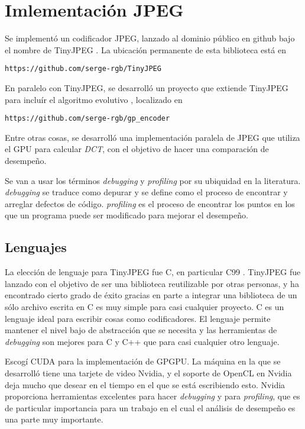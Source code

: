 \chapter{Imlementación JPEG}\label{ch:implementacion}

Se implementó un codificador JPEG, lanzado al dominio público en github bajo el
nombre de TinyJPEG \cite{tiny_jpeg}. La ubicación permanente de esta biblioteca
está en \begin{alltt}https://github.com/serge-rgb/TinyJPEG \end{alltt}

En paralelo con TinyJPEG, se desarrolló un proyecto que extiende TinyJPEG para
incluír el algoritmo evolutivo \cite{gp_encoder}, localizado en
\begin{alltt}https://github.com/serge-rgb/gp_encoder\end{alltt} Entre otras
cosas, se desarrolló una implementación paralela de JPEG que utiliza el GPU
para calcular \emph{DCT}, con el objetivo de hacer una comparación de
desempeño.

Se van a usar los términos \emph{debugging} y \emph{profiling} por su ubiquidad
en la literatura. \emph{debugging} se traduce como depurar y se define como el
proceso de encontrar y arreglar defectos de código. \emph{profiling} es el
proceso de encontrar los puntos en los que un programa puede ser modificado
para mejorar el desempeño.

\section{Lenguajes}

La elección de lenguaje para TinyJPEG fue C, en particular C99 \cite{c99}.
TinyJPEG fue lanzado con el objetivo de ser una biblioteca reutilizable por
otras personas, y ha encontrado cierto grado de éxito gracias en parte a
integrar una biblioteca de un sólo archivo escrita en C es muy simple para casi
cualquier proyecto. C es un lenguaje ideal para escribir cosas como
codificadores. El lenguaje permite mantener el nivel bajo de abstracción que se
necesita y las herramientas de \emph{debugging} son mejores para C y C++ que
para casi cualquier otro lenguaje.

Escogí CUDA para la implementación de GPGPU. La máquina en la que se desarrolló
tiene una tarjete de video Nvidia, y el soporte de OpenCL en Nvidia deja mucho
que desear en el tiempo en el que se está escribiendo esto. Nvidia proporciona
herramientas excelentes para hacer \emph{debugging} y para \emph{profiling},
que es de particular importancia para un trabajo en el cual el análisis de
desempeño es una parte muy importante.

